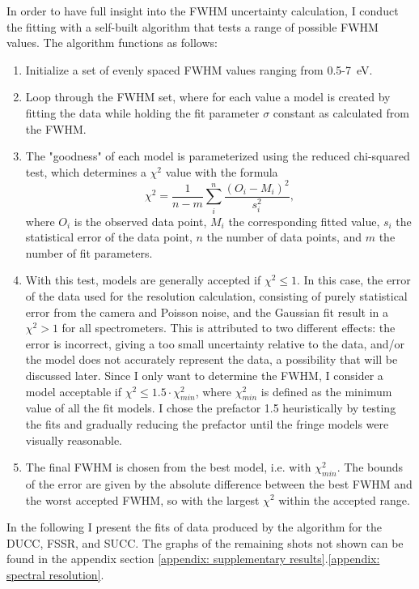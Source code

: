 In order to have full insight into the FWHM uncertainty calculation, I conduct the fitting with a self-built algorithm that tests a range of possible FWHM values. The algorithm functions as follows:
\begin{enumerate}
	\item Initialize a set of evenly spaced FWHM values ranging from 0.5-\SI{7}{\electronvolt}.
	\item Loop through the FWHM set, where for each value a model is created by fitting the data while holding the fit parameter $\sigma$ constant as calculated from the FWHM.
	\item The "goodness" of each model is parameterized using the reduced chi-squared test, which determines a $\chi^2$ value with the formula
	\begin{equation}
		\chi^2 = \frac{1}{n-m}\sum_{i}^{n}\frac{(O_i-M_i)^2}{s_i^2},
	\end{equation}
	where $O_i$ is the observed data point, $M_i$ the corresponding fitted value, $s_i$ the statistical error of the data point, $n$ the number of data points, and $m$ the number of fit parameters.
	\item With this test, models are generally accepted if $\chi^2\leq 1$. In this case, the error of the data used for the resolution calculation, consisting of purely statistical error from the camera and Poisson noise, and the Gaussian fit result in a $\chi^2 > 1$ for all spectrometers. This is attributed to two different effects: the error is incorrect, giving a too small uncertainty relative to the data, and/or the model does not accurately represent the data, a possibility that will be discussed later. Since I only want to determine the FWHM, I consider a model acceptable if $\chi^2\leq1.5\cdot\chi^2_{min}$, where $\chi^2_{min}$ is defined as the minimum value of all the fit models. I chose the prefactor 1.5 heuristically by testing the fits and gradually reducing the prefactor until the fringe models were visually reasonable.
	\item The final FWHM is chosen from the best model, i.e. with $\chi^2_{min}$. The bounds of the error are given by the absolute difference between the best FWHM and the worst accepted FWHM, so with the largest $\chi^2$ within the accepted range.
\end{enumerate}
In the following I present the fits of data produced by the algorithm for the DUCC, FSSR, and SUCC. The graphs of the remaining shots not shown can be found in the appendix section \ref{appendix: supplementary results}.\ref{appendix: spectral resolution}.

